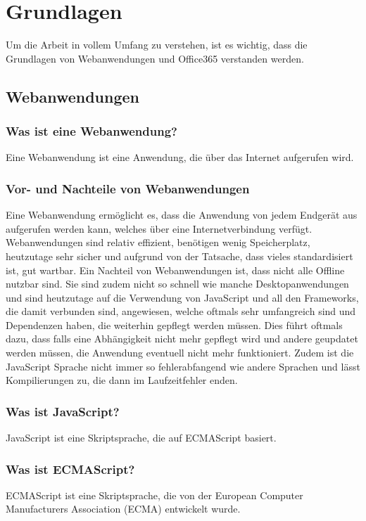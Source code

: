 
\section{Grundlagen}
Um die Arbeit in vollem Umfang zu verstehen, ist es wichtig, dass die Grundlagen von Webanwendungen und Office365 verstanden werden.
\subsection{Webanwendungen}
\subsubsection{Was ist eine Webanwendung?}
Eine Webanwendung ist eine Anwendung, die über das Internet aufgerufen wird.
\subsubsection{Vor- und Nachteile von Webanwendungen}
Eine Webanwendung ermöglicht es, dass die Anwendung von jedem Endgerät aus aufgerufen werden kann, welches über eine Internetverbindung verfügt.
Webanwendungen sind relativ effizient, benötigen wenig Speicherplatz, heutzutage sehr sicher und aufgrund von der Tatsache, dass vieles standardisiert ist, gut wartbar.
\newline
\newline
Ein Nachteil von Webanwendungen ist, dass nicht alle Offline nutzbar sind.
Sie sind zudem nicht so schnell wie manche Desktopanwendungen und sind heutzutage auf die Verwendung von JavaScript und all den Frameworks, die damit verbunden sind, angewiesen, welche oftmals sehr umfangreich sind und Dependenzen haben, die weiterhin gepflegt werden müssen.
Dies führt oftmals dazu, dass falls eine Abhängigkeit nicht mehr gepflegt wird und andere geupdatet werden müssen, die Anwendung eventuell nicht mehr funktioniert.
Zudem ist die JavaScript Sprache nicht immer so fehlerabfangend wie andere Sprachen und lässt Kompilierungen zu, die dann im Laufzeitfehler enden.
\subsubsection{Was ist JavaScript?}
JavaScript ist eine Skriptsprache, die auf ECMAScript basiert.
\subsubsection{Was ist ECMAScript?}
ECMAScript ist eine Skriptsprache, die von der European Computer Manufacturers Association (ECMA) entwickelt wurde.

